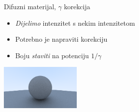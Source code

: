 \documentclass[9pt]{beamer}
\begin{document}
\begin{frame}{Difuzni materijal, $\gamma$ korekcija}
	\begin{itemize}
		\item \textit{Dijelimo} intenzitet s nekim intenzitetom
		\item Potrebno je napraviti korekciju
		\item Boju \textit{staviti} na potenciju $1/\gamma$
	\end{itemize}
	\begin{center}
		\includegraphics[width=4cm]{slike/img-1.08-gamma-correct.png}
	\end{center}
\end{frame}
\end{document}
